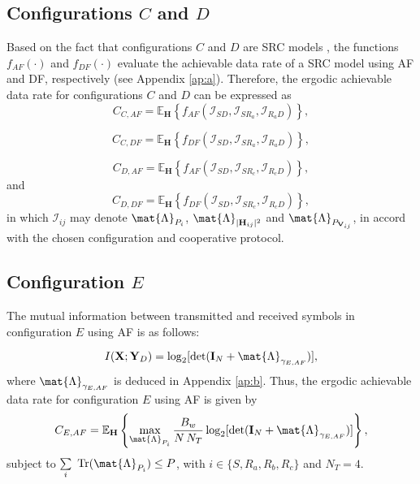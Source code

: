 \subsection{\textbf{Configurations $C$ and $D$}}\label{subsec:confc&d}

Based on the fact that configurations $C$ and $D$ are \ac{SRC} models \cite{Michelle2016}, the functions $ f_{AF}(\cdot) $ and $ f_{DF}(\cdot) $ evaluate the achievable data rate of a \ac{SRC} model using \ac{AF} and \ac{DF}, respectively (see Appendix \ref{ap:a}). Therefore, the ergodic achievable data rate for configurations $C$ and $D$ can be expressed as
\begin{equation}\label{eq:confcaf}
	C_{C,AF} = \mathbb{E}_{\mathbf{H}} \left\{ f_{AF}(\mathcal{I}_{SD},\mathcal{I}_{SR_{a}},\mathcal{I}_{R_{a}D})\right\},
\end{equation}

\begin{equation}\label{eq:confcdf}
	C_{C,DF} = \mathbb{E}_{\mathbf{H}} \left\{ f_{DF}(\mathcal{I}_{SD},\mathcal{I}_{SR_{a}},\mathcal{I}_{R_{a}D})\right\},
\end{equation}

\begin{equation}\label{eq:confdaf}
	C_{D,AF} = \mathbb{E}_{\mathbf{H}} \left\{ f_{AF}(\mathcal{I}_{SD},\mathcal{I}_{SR_{c}},\mathcal{I}_{R_{c}D})\right\},
\end{equation}
and
\begin{equation}\label{eq:confddf}
	C_{D,DF} = \mathbb{E}_{\mathbf{H}} \left\{ f_{DF}(\mathcal{I}_{SD},\mathcal{I}_{SR_{c}},\mathcal{I}_{R_{c}D})\right\},
\end{equation}
in which $ \mathcal{I}_{ij} $ may denote $\mat{\Lambda}_{P_{i}}$, $\mat{\Lambda}_{|\mathbf{H}_{ij}|^2}$ and $\mat{\Lambda}_{P_{\mathbf{V}_{ij}}} $, in accord with the chosen configuration and cooperative protocol.

\subsection{\textbf{Configuration $E$}}\label{subsec:confe}

The mutual information between transmitted and received symbols in configuration $E$ using \ac{AF} is as follows:

\begin{equation}
I(\mathbf{X};\mathbf{Y}_{D}) = \log_{2} [\text{det}(\mathbf{I}_{N}+ \mat{\Lambda}_{\gamma_{E,AF}})],
\end{equation}
where $\mat{\Lambda}_{\gamma_{E,AF}}$ is deduced in Appendix \ref{ap:b}. Thus, the ergodic achievable data rate for configuration $E$ using \ac{AF} is given by 
\begin{equation}\label{eq:ceaf}
C_{E,AF} = \mathbb{E}_{\mathbf{H}} \left\{\max_{\mat{\Lambda}_{P_{i}}} \dfrac{B_{w}}{N \, N_{T}} \log_{2} [\text{det}(\mathbf{I}_{N} + \mat{\Lambda}_{\gamma_{E,AF}})]\right\},
\end{equation}
subject to $ \sum\limits_{i} \ \text{Tr}(\mat{\Lambda}_{P_{i}}) \leq P $, with $i \in \{S,R_a,R_b,R_c\}$ and $ N_T = 4 $.

